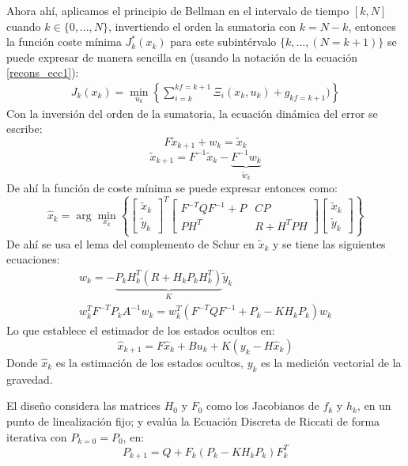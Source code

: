 \documentclass[10pt]{report}
\numberwithin{equation}{chapter}
\numberwithin{algorithm}{chapter}
\begin{document}
Ahora ahí, aplicamos el principio de Bellman en el intervalo de tiempo $[k,N]$ cuando $k\in\{0,...,N\}$, invertiendo el orden la sumatoria con $k=N-k$, entonces la función coste mínima $J^*_k(x_k)$ para este subintérvalo $\{k,...,(N=k+1)\}$ se puede expresar de manera sencilla en (usando la notación de la ecuación \eqref{recons_ecc1}):
\begin{gather}
J_k(x_k)=\min_{u_k} \left\{\sum_{i=k}^{kf=k+1}\Xi_i(x_k,u_k)+g_{kf=k+1})\right\}\label{filtro_ecc33}
\end{gather}
Con la inversión del orden de la sumatoria, la ecuación dinámica del error se escribe:
$$F\tilde{x}_{k+1}+w_k=\tilde{x}_k$$
$$\tilde{x}_{k+1}=F^{-1}\tilde{x}_k-\underbrace{F^{-1}w_k}_{\tilde{w}_k}$$
De ahí la función de coste mínima se puede expresar entonces como:
$$\hat{x}_k=\arg\min_{x_k}\left\{\begin{bmatrix}\tilde{x}_k\\\tilde{y}_k\end{bmatrix}^T
\begin{bmatrix}F^{-T}QF^{-1}+P&CP\\PH^T&R+H^TPH\end{bmatrix} \begin{bmatrix}\tilde{x}_k\\\tilde{y}_k\end{bmatrix} \right\}$$
De ahí se usa el lema del complemento de Schur en 
$\tilde{x}_k$ y se tiene las siguientes ecuaciones:
\begin{gather}
w_{k}=-\underbrace{P_kH_k^T(R+H_kP_kH_k^T)}_K\tilde{y}_k\\
w_k^TF^{-T}P_kA^{-1}w_k=w_k^T(F^{-T}QF^{-1}+P_k-KH_kP_k)w_k
\end{gather}
Lo que establece el estimador de los estados ocultos en:
\begin{equation}\label{chap2:ObservadorLineal}
\hat{x}_{k+1}=F\hat{x}_k+Bu_{k}+K(y_k-H\hat{x}_k)
\end{equation}
Donde $\hat{x}_k$ es la estimación de los estados ocultos, $y_k$ es la medición vectorial de la gravedad. \par
El diseño considera las matrices $H_0$ y $F_0$ como los Jacobianos de $f_k$ y $h_k$, en un punto de linealización fijo; y evalúa la Ecuación Discreta de Riccati de forma iterativa con $P_{k=0}=P_0$, en:
\begin{equation}\label{filtro_ecc10}P_{k+1}=Q+F_k(P_k-KH_kP_k)F_k^T\end{equation}
\end{document}
